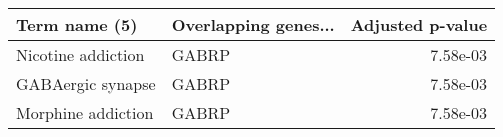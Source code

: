 \begin{tabular}{llr}
\toprule
     Term name (5) & Overlapping genes... &  Adjusted p-value \\
\midrule
Nicotine addiction &                GABRP &          7.58e-03 \\
 GABAergic synapse &                GABRP &          7.58e-03 \\
Morphine addiction &                GABRP &          7.58e-03 \\
\bottomrule
\end{tabular}
